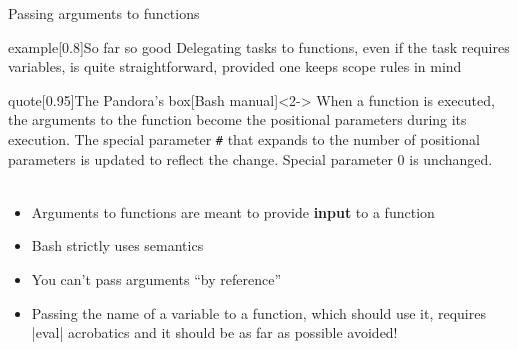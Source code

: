 \begin{frame}{Passing arguments to functions}
    \vspace{-3mm}
    \begin{varblock}{example}[0.8\textwidth]{So far so good}
        Delegating tasks to functions, even if the task requires variables, is quite straightforward, provided one keeps scope rules in mind
    \end{varblock}
    \begin{varblock}{quote}[0.95\textwidth]{The Pandora's box}[Bash manual]<2->
        When a function is executed, the arguments to the function become the positional parameters during its execution.
        The special parameter \texttt{\#} that expands to the number of positional parameters is updated to reflect the change.
        Special parameter 0 is unchanged.\\[-1.5ex] ~
    \end{varblock}
    \vspace{-2mm}
    \begin{itemize}[<3->]
        \item Arguments to functions are meant to provide \textbf{input} to a function
        \item Bash strictly uses  semantics
        \item You can't pass arguments ``by reference''\\[-0.5ex] 
        \item \alert{Passing the name of a variable to a function}, which should use it, requires \bash|eval| acrobatics and it \alert{should be as far as possible avoided!}
    \end{itemize}
\end{frame}
